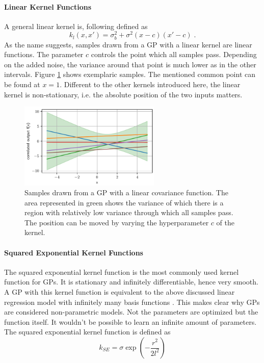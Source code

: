 \documentclass[%
  a4paper,oneside,%
  11pt,%
  smallchapters,
  style=printdev,
  extramargin,
  green,%
  rgb, <cmyk>
  ]{tubsbook}
\begin{document}
\paragraph{Linear Kernel Functions}
A general linear kernel is, following \cite{Duvenaud} defined as
\begin{equation}
k_l(x,x') = \sigma_b^2 + \sigma^2 (x-c) (x'-c) \;.
\end{equation}
As the name suggests, samples drawn from a GP with a linear kernel are linear functions. The parameter $c$ controls the point which all samples pass. Depending on the added noise, the variance around that point is much lower as in the other intervals. Figure \ref{fig:Linear} shows exemplaric samples. The mentioned common point can be found at $x=1$. Different to the other kernels introduced here, the linear kernel is non-stationary, i.e. the absolute position of the two inputs matters.
\begin{figure}[!ht]
\begin{center}
\includegraphics[width=0.6\textwidth]{pics/LinearKernel.pdf}
\caption[Samples from a GP with linear kernel]{Samples drawn from a GP with a linear covariance function. The area represented in green shows the variance of which there is a region with relatively low variance through which all samples pass. The position can be moved by varying the hyperparameter $c$ of the kernel.}
\label{fig:Linear}
\end{center}
\end{figure}



\paragraph{Squared Exponential Kernel Functions}
The squared exponential kernel function is the most commonly used kernel function for GPs. It is stationary and infinitely differentiable, hence very smooth. A GP with this kernel function is equivalent to the above discussed linear regression model with infinitely many basis functions \cite{rasmussen2006}. This makes clear why GPs are considered non-parametric models. Not the parameters are optimized but the function itself. It wouldn't be possible to learn an infinite amount of parameters.
The squared exponential kernel function is defined as
\begin{equation}
k_{SE} = \sigma \exp(-\frac{r^2}{2l^2})
\end{equation}
\end{document}
